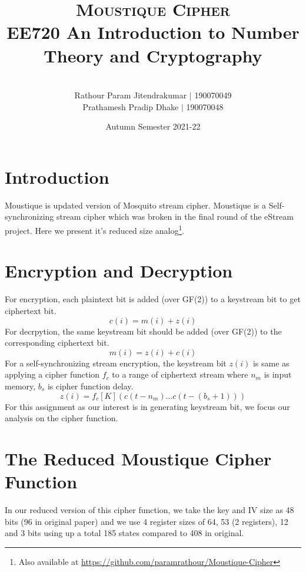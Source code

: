 \documentclass[a4paper,10pt]{article}
\title{\vspace*{-2em}\textsc{Moustique Cipher}\\[0.5em]\Large{{EE720 {An Introduction to Number Theory and Cryptography}}}}
\author{\\[-3em]Rathour Param Jitendrakumar $\vert$ 190070049\\Prathamesh Pradip
Dhake $\vert$ 190070048}
\date{\vspace*{-1em}Autumn Semester 2021-22}
\begin{document}
\maketitle
\tableofcontents
\section{Introduction}
Moustique is updated version of Mosquito stream cipher. Moustique is a Self-synchronizing stream cipher which was broken in the final round of the eStream project. Here we present it's reduced size analog\footnote{Also available at \url{https://github.com/paramrathour/Moustique-Cipher}}.
\section{Encryption and Decryption}
For encryption, each plaintext bit is added (over GF(2)) to a keystream bit to get ciphertext bit.
\begin{equation}
    c(i) = m(i) + z(i)
\end{equation}
For decrpytion, the same keystream bit should be added (over GF(2)) to the corresponding ciphertext bit.
\begin{equation}
    m(i) = z(i) + c(i)
\end{equation}
For a self-synchronizing stream encryption, the keystream bit $z(i)$ is same as applying a cipher function $f_c$ to a range of ciphertext stream where $n_m$ is input memory, $b_s$ is cipher function delay.
\begin{equation}
    z(i) = f_c[K](c(t-n_m)\ldots c(t-(b_s+1)))
\end{equation}
For this assignment as our interest is in generating keystream bit, we focus our analysis on the cipher function.
\section{The Reduced Moustique Cipher Function}
In our reduced version of this cipher function, we take the key and IV size as 48 bits (96 in original paper) and we use 4 register sizes of 64, 53 (2 registers), 12 and 3 bits using up a total 185 states compared to 408 in original.
\end{document}
